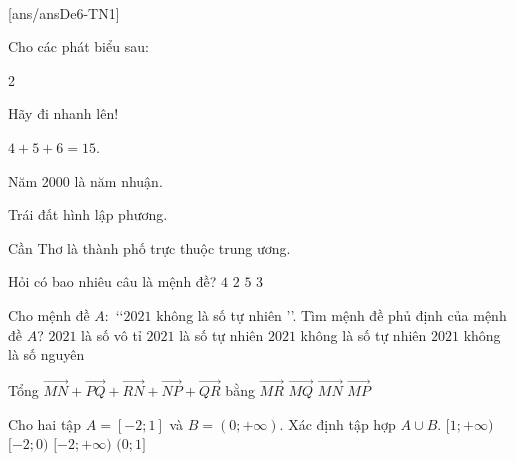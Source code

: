 ﻿﻿\begin{name}
	{\tenchude}
	{\tendethi}
	{\tentruong}
	{\thoigian}
\end{name}
\setcounter{ex}{0}\setcounter{bt}{0}
\TN
{}[ans/ansDe6-TN1]
\begin{ex}%
	Cho các phát biểu sau:
	\begin{enumerate}
	\end{enumerate}
	Hỏi có bao nhiêu câu là mệnh đề?
	\choice
	{\True $4$}
	{$2$}
	{$5$}
	{$3$}
\end{ex}

\begin{ex}%
	Cho mệnh đề $A \colon$ \lq \lq $2021$ không là số tự nhiên \rq \rq. Tìm mệnh đề phủ định của mệnh đề $A$?
	\choice
	{$2021$ là số vô tỉ}
	{\True $2021$ là số tự nhiên}
	{$2021$ không là số tự nhiên}
	{$2021$ không là số nguyên}
	\loigiai{

	}
\end{ex}

\begin{ex}%
	Tổng $\overrightarrow{MN} + \overrightarrow{PQ} + \overrightarrow{RN} + \overrightarrow{NP} + \overrightarrow{QR}$ bằng
	\choice
	{$\overrightarrow{MR}$}
	{$\overrightarrow{MQ}$}
	{\True $\overrightarrow{MN}$}
	{$\overrightarrow{MP}$}
\end{ex}

\begin{ex}%
	Cho hai tập $A=[-2;1]$ và $B=(0;+\infty)$. Xác định tập hợp $A\cup B$.
	\choice
	{$[1;+\infty)$}
	{$[-2;0)$}
	{\True $[-2;+\infty)$}
	{$(0;1]$}
	\loigiai{
	Ta có $A\cup B=[-2;+\infty)$.
	}
\end{ex}

